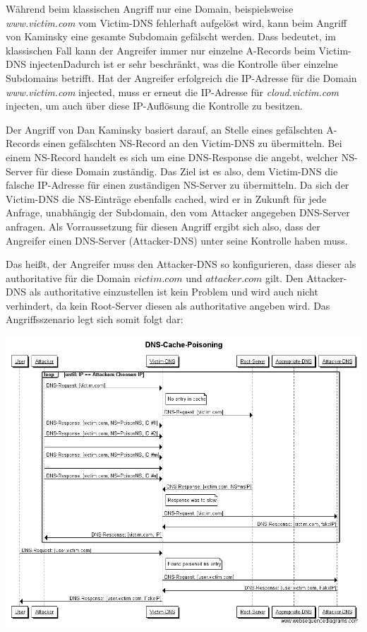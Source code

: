 \documentclass[10pt,a4paper]{article}
\begin{document}
Während beim klassischen Angriff nur eine Domain, beispielsweise \emph{www.victim.com} vom Victim-DNS fehlerhaft aufgelöst wird, kann beim Angriff von Kaminsky eine gesamte Subdomain gefälscht werden. Dass bedeutet, im klassischen Fall kann der Angreifer immer nur einzelne A-Records beim Victim-DNS \glqq injecten\grqq\. Dadurch ist er sehr beschränkt, was die Kontrolle über einzelne Subdomains betrifft. Hat der Angreifer erfolgreich die IP-Adresse für die Domain \emph{www.victim.com} \glqq injected\grqq, muss er erneut die IP-Adresse für \emph{cloud.victim.com}  \glqq injecten\grqq, um auch über diese IP-Auflösung die Kontrolle zu besitzen. 

Der Angriff von Dan Kaminsky basiert darauf, an Stelle eines gefälschten A-Records einen gefälschten NS-Record an den Victim-DNS zu übermitteln. Bei einem NS-Record handelt es sich um eine DNS-Response die angebt, welcher NS-Server für diese Domain zuständig. Das Ziel ist es also, dem Victim-DNS die falsche IP-Adresse für einen zuständigen NS-Server zu übermitteln. Da sich der Victim-DNS die NS-Einträge ebenfalls cached, wird er in Zukunft für jede Anfrage, unabhängig der Subdomain, den vom Attacker angegeben DNS-Server anfragen. Als Vorraussetzung für diesen Angriff ergibt sich also, dass der Angreifer einen DNS-Server (Attacker-DNS) unter seine Kontrolle haben muss. 

Das heißt, der Angreifer muss den Attacker-DNS so konfigurieren, dass dieser als authoritative für die Domain $victim.com$ und $attacker.com$ gilt. Den Attacker-DNS als authoritative einzustellen ist kein Problem und wird auch nicht verhindert, da kein Root-Server diesen als authoritative angeben wird. Das Angriffsszenario legt sich somit folgt dar:

{
\centering
\includegraphics[scale=0.35]{DNS-Cache-Poisoning.png}
}
\end{document}
